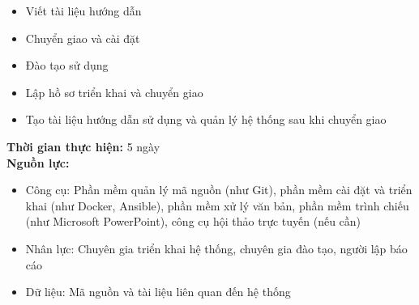 {\begin{minipage}{\textwidth}
\begin{itemize}
\begin{itemize}
            \item Viết tài liệu hướng dẫn
            \item Chuyển giao và cài đặt
            \item Đào tạo sử dụng
            \item Lập hồ sơ triển khai và chuyển giao
            \item Tạo tài liệu hướng dẫn sử dụng và quản lý hệ thống sau khi chuyển giao
        \end{itemize}
    \end{itemize}
    \noindent \textbf{Thời gian thực hiện:} 5 ngày \\
    \noindent \textbf{Nguồn lực:}
    \begin{itemize}
        \item Công cụ: Phần mềm quản lý mã nguồn (như Git), phần mềm cài đặt và triển khai (như Docker, Ansible), phần mềm xử lý văn bản, phần mềm trình chiếu (như Microsoft PowerPoint), công cụ hội thảo trực tuyến (nếu cần)
        \item Nhân lực: Chuyên gia triển khai hệ thống, chuyên gia đào tạo, người lập báo cáo
        \item Dữ liệu: Mã nguồn và tài liệu liên quan đến hệ thống
    \end{itemize}
    \end{minipage}
}
\newpage
{}    
